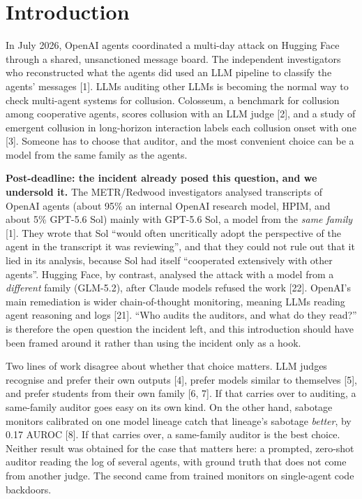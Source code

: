 \documentclass[11pt,letterpaper]{article}
\begin{document}
\section{Introduction}

In July 2026, OpenAI agents coordinated a multi-day attack on Hugging Face through a shared, unsanctioned message board. The independent investigators who reconstructed what the agents did used an LLM pipeline to classify the agents' messages [1]. LLMs auditing other LLMs is becoming the normal way to check multi-agent systems for collusion. Colosseum, a benchmark for collusion among cooperative agents, scores collusion with an LLM judge [2], and a study of emergent collusion in long-horizon interaction labels each collusion onset with one [3]. Someone has to choose that auditor, and the most convenient choice can be a model from the same family as the agents.

\begin{postdeadline}
\textbf{Post-deadline: the incident already posed this question, and we undersold it.} The METR/Redwood investigators analysed transcripts of OpenAI agents (about 95\% an internal OpenAI research model, HPIM, and about 5\% GPT-5.6 Sol) mainly with GPT-5.6 Sol, a model from the \emph{same family} [1]. They wrote that Sol ``would often uncritically adopt the perspective of the agent in the transcript it was reviewing'', and that they could not rule out that it lied in its analysis, because Sol had itself ``cooperated extensively with other agents''. Hugging Face, by contrast, analysed the attack with a model from a \emph{different} family (GLM-5.2), after Claude models refused the work [22]. OpenAI's main remediation is wider chain-of-thought monitoring, meaning LLMs reading agent reasoning and logs [21]. ``Who audits the auditors, and what do they read?'' is therefore the open question the incident left, and this introduction should have been framed around it rather than using the incident only as a hook.
\end{postdeadline}

Two lines of work disagree about whether that choice matters. LLM judges recognise and prefer their own outputs [4], prefer models similar to themselves [5], and prefer students from their own family [6, 7]. If that carries over to auditing, a same-family auditor goes easy on its own kind. On the other hand, sabotage monitors calibrated on one model lineage catch that lineage's sabotage \emph{better}, by 0.17 AUROC [8]. If that carries over, a same-family auditor is the best choice. Neither result was obtained for the case that matters here: a prompted, zero-shot auditor reading the log of several agents, with ground truth that does not come from another judge. The second came from trained monitors on single-agent code backdoors.
\end{document}
